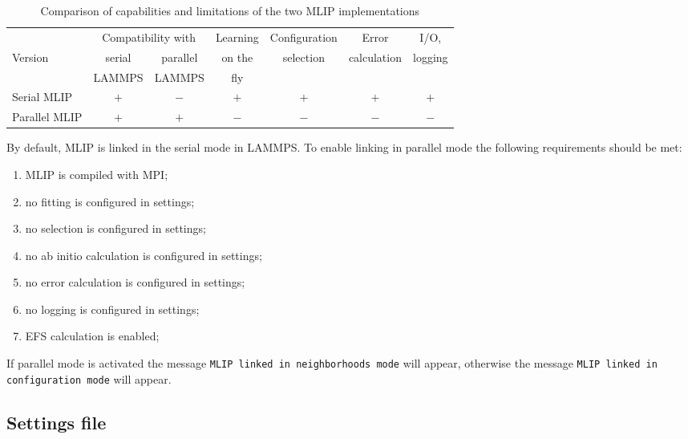 \documentclass[12pt]{article}
\renewcommand{\_}{\char`_}
\begin{document}
\begin{table}[htbp]	\small
	\centering
	\caption{Comparison of capabilities and limitations of the two MLIP implementations}
	
	\medskip
	\label{tab:table1}
	\begin{tabular}{l|c|c|c|c|c|c}
		\hline
		& \multicolumn{2}{c|}{Compatibility with} & Learning & Configuration & Error & I/O, \\
		
		Version & serial & parallel  & on the & selection & calculation &  logging\\
		
		&LAMMPS &LAMMPS & fly & & & \\
		\hline
		Serial MLIP  & $+$ & $-$ & $+$ & $+$ & $+$ & $+$    \\
		Parallel MLIP& $+$ & $+$ & $-$ & $-$ & $-$ & $-$  \\
		\hline
	\end{tabular}
\end{table}

By default, MLIP is linked in the serial mode in LAMMPS. To enable linking in parallel mode the following requirements should be met: 
\begin{enumerate}
	\item MLIP is compiled with MPI;
	\item no fitting is configured in settings;
	\item no selection is configured in settings;
	\item no ab initio calculation is configured in settings;
	\item no error calculation is configured in settings;
	\item no logging is configured in settings;
	\item EFS calculation is enabled;
\end{enumerate}
If parallel mode is activated the message \texttt{MLIP linked in neighborhoods mode} will appear, otherwise the message \texttt{MLIP linked in configuration mode} will appear.


\subsection{Settings file}\label{Settings}
\end{document}
